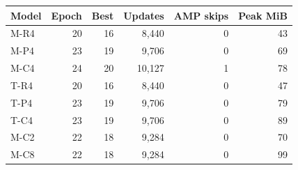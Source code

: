 \begin{tabular}{lrrrrr}
\toprule
Model & Epoch & Best & Updates & AMP skips & Peak MiB\\
\midrule
M-R4 & 20 & 16 & 8,440 & 0 & 43\\
M-P4 & 23 & 19 & 9,706 & 0 & 69\\
M-C4 & 24 & 20 & 10,127 & 1 & 78\\
T-R4 & 20 & 16 & 8,440 & 0 & 47\\
T-P4 & 23 & 19 & 9,706 & 0 & 79\\
T-C4 & 23 & 19 & 9,706 & 0 & 89\\
M-C2 & 22 & 18 & 9,284 & 0 & 70\\
M-C8 & 22 & 18 & 9,284 & 0 & 99\\
\bottomrule
\end{tabular}

